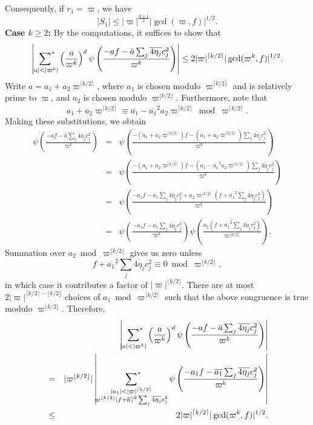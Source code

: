\documentclass[11pt]{amsart}
\theoremstyle{plain}
\theoremstyle{plain}
\theoremstyle{remark}
\theoremstyle{definition}
\newcommand{\sumstar}{\sideset{}{^*}\sum}
\begin{document}
Consequently, if $r_1=\varpi$, we have
\[|S_1|\leq |\varpi|^{\frac{d+1}{2}}|\gcd(\varpi,f)|^{1/2}.\]
\textbf{Case $k\geq 2$:} By the computations, it suffices to show that 
\[\left|\sumstar_{|a|<|\varpi^k|} \left(\frac{a}{\varpi^k} \right)^d \psi\left(\frac{-af-\bar{a}\sum_{j}\overline{4\eta_j}c_j^2}{\varpi^k}  \right)\right|\leq 2|\varpi|^{\lceil k/2\rceil}|\gcd(\varpi^k,f)|^{1/2}.\]
Write $a=a_1+a_2\varpi^{\lceil k/2\rceil}$, where $a_1$ is chosen modulo $\varpi^{\lceil k/2\rceil}$ and is relatively prime to $\varpi$, and $a_2$ is chosen modulo $\varpi^{\lfloor k/2\rfloor}$. Furthermore, note that
\[\overline{a_1+a_2\varpi^{\lceil k/2\rceil}}\equiv \overline{a_1}-\overline{a_1}^2a_2\varpi^{\lceil k/2\rceil}\bmod\varpi^{\lceil k/2\rceil}.\]
Making these substitutions, we obtain
\begin{eqnarray*}
\psi\left(\frac{-af-\bar{a}\sum_{j}\overline{4\eta_j}c_j^2}{\varpi^k}\right)&=&\psi\left(\frac{-(a_1+a_2\varpi^{\lceil k/2\rceil})f-(\overline{a_1+a_2\varpi^{\lceil k/2\rceil}})\sum_{j}\overline{4\eta_j}c_j^2}{\varpi^k}\right)\\ &=& \psi\left(\frac{-(a_1+a_2\varpi^{\lceil k/2\rceil})f-(\overline{a_1}-\overline{a_1}^2a_2\varpi^{\lceil k/2\rceil})\sum_{j}\overline{4\eta_j}c_j^2}{\varpi^k}\right)\\ &=& \psi\left(\frac{-a_1f-\overline{a_1}\sum_{j}\overline{4\eta_j}c_j^2+a_2\varpi^{\lceil k/2\rceil}\left(f+\overline{a_1}^2\sum_{j}\overline{4\eta_j}c_j^2\right)}{\varpi^k}\right)\\ &=& \psi\left(\frac{-a_1f-\overline{a_1}\sum_{j}\overline{4\eta_j}c_j^2}{\varpi^k}\right)\psi\left(\frac{a_2\left(f+\overline{a_1}^2\sum_{j}\overline{4\eta_j}c_j^2\right)}{\varpi^{\lfloor k/2\rfloor}}\right).
\end{eqnarray*}
Summation over $a_2\bmod\varpi^{\lfloor k/2\rfloor}$ gives us zero unless
\[f+\overline{a_1}^2\sum_{j}\overline{4\eta_j}c_j^2\equiv 0\bmod \varpi^{\lfloor k/2\rfloor},\]
in which case it contributes a factor of $|\varpi|^{\lfloor k/2\rfloor}$. There are at most $2|\varpi|^{\lceil k/2\rceil-\lfloor k/2\rfloor}$ choices of $a_1\bmod\varpi^{\lceil k/2\rceil}$ such that the above congruence is true modulo $\varpi^{\lfloor k/2\rfloor}$. Therefore,
\begin{eqnarray*}&&\left|\sumstar_{|a|<|\varpi^k|} \left(\frac{a}{\varpi^k} \right)^d \psi\left(\frac{-af-\bar{a}\sum_{j}\overline{4\eta_j}c_j^2}{\varpi^k}  \right)\right|\\&=&|\varpi^{\lfloor k/2\rfloor}|\left|\sumstar_{\substack{|a_1|<|\varpi|^{\lceil k/2\rceil}\\ \varpi^{\lfloor k/2\rfloor}|f+\overline{a_1}^2\sum_{j}\overline{4\eta_j}c_j^2}}\psi\left(\frac{-a_1f-\overline{a_1}\sum_{j}\overline{4\eta_j}c_j^2}{\varpi^k}\right)\right|\\&\leq& 2|\varpi|^{\lceil k/2\rceil}|\gcd(\varpi^k,f)|^{1/2}.
\end{eqnarray*}
\end{document}
